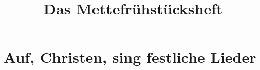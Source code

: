 \documentclass[a5paper, landscape]{article}
\title{Das Mettefrühstücksheft}
\begin{document}
\maketitle

\tableofcontents

\section{Auf, Christen, sing festliche Lieder}
\end{document}
